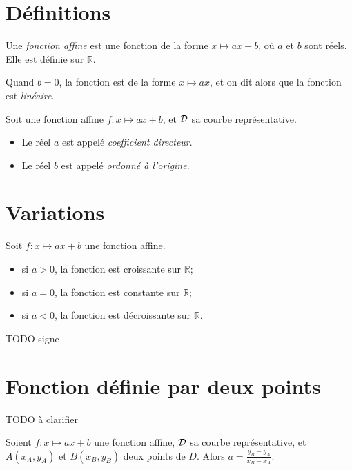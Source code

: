 \section{Définitions}

\begin{definition}
  Une \emph{fonction affine} est une fonction de la forme $x\mapsto ax+b$, où $a$ et $b$ sont réels. Elle est définie sur $\mathbb R$.

  Quand $b=0$, la fonction est de la forme $x\mapsto ax$, et on dit alors que la fonction est \emph{linéaire}.
\end{definition}

\begin{definition}Soit une fonction affine $f:x\mapsto ax+b$, et $\cal D$ sa courbe représentative.
  \begin{itemize}
    \item Le réel $a$ est appelé \emph{coefficient directeur}.
    \item Le réel $b$ est appelé \emph{ordonné à l'origine}.
  \end{itemize}
\end{definition}


\section{Variations}

\begin{propriete}
  Soit $f:x\mapsto ax+b$ une fonction affine.
  \begin{itemize}
    \item si $a>0$, la fonction est croissante sur $\mathbb R$;
    \item si $a=0$, la fonction est constante sur $\mathbb R$;
    \item si $a<0$, la fonction est décroissante sur $\mathbb R$.
  \end{itemize}
\end{propriete}

TODO signe

\section{Fonction définie par deux points} TODO à clarifier

\begin{propriete}
  Soient $f:x\mapsto ax+b$ une fonction affine, $\cal D$ sa courbe
  représentative, et $A(x_A,y_A)$ et $B(x_B,y_B)$ deux points de $D$. Alors
  $a=\frac{y_B-y_A}{x_B-x_A}$.
\end{propriete}


